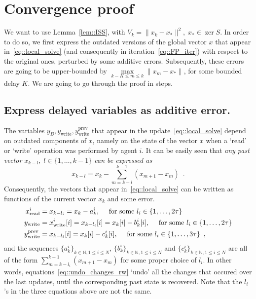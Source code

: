 \documentclass[envcountsect]{svjour3}
\begin{document}
\section{Convergence proof}\label{sec::proof} %
We want to use Lemma~\ref{lem::ISS}, with $V_k=\|x_k-x_\ast\|^2,\;x_\ast\in\operatorname{zer} S$. In order to do so, we first express the outdated versions of the global vector $x$ that appear in~\eqref{eq::local_solve} (and consequently in iteration~\eqref{eq::FP_iter}) with respect to the original ones, perturbed by some additive errors. Subsequently, these errors are going to be upper-bounded by $\underset{k-K\leq m\leq k}{\max}\|x_m-x_\ast\|$, for some bounded delay $K$. We are going to go through the proof in steps.


\subsection{Express delayed variables as additive error. }
The variables $y_B,y_\mathrm{write},y_\mathrm{write}^\mathrm{prev}$ that appear in the update~\eqref{eq::local_solve} depend on outdated components of $x$, namely on the state of the vector $x$ when a `read' or `write' operation was performed by agent $i$. It can be easily seen that \emph{any past vector $x_{k-l},\;l\in\{1,\ldots,k-1\}$ can be expressed as}
\[
x_{k-l} = x_k - \sum_{m=k-l}^{k-1}(x_{m+1}-x_m)\enspace.
\]
Consequently, the vectors that appear in~\eqref{eq::local_solve} can be written as functions of the current vector $x_k$ and some error.
\begin{align}{\label{eq::undo_changes_rw}}
x^i_\mathrm{read} \nonumber &= x_{k-l_i} = x_k - a_k^i, \quad \mbox{ for some } l_i\in\{1,\ldots,2\tau\}\\
y_\mathrm{write} \nonumber  &= x^i_\mathrm{write}[i] = x_{k-l_i}[i] = x_k[i] - b_k^i[i], \quad \mbox{ for some } l_i\in\{1,\ldots,2\tau\}\\
y_\mathrm{write}^\mathrm{prev} &= x_{k-l_i}[i] = x_k[i] - c_k^i[i], \quad \mbox{ for some } l_i\in\{1,\ldots,3\tau\}\enspace,
\end{align}
and the sequences $\{a_k^i\}_{k\in\mathbb{N},1\leq i\leq N}$, $\{b_k^i\}_{k\in\mathbb{N},1\leq i\leq N}$ and $\{c_k^i\}_{k\in\mathbb{N},1\leq i\leq N}$ are all of the form $\sum_{m=k-l_i}^{k-1}(x_{m+1}-x_m)$ for some proper choice of $l_i$.
In other words, equations~\eqref{eq::undo_changes_rw} `undo' all the changes that occured over the last updates, until the corresponding past state is recovered. Note that the $l_i$'s in the three equations above are not the same.
\end{document}
